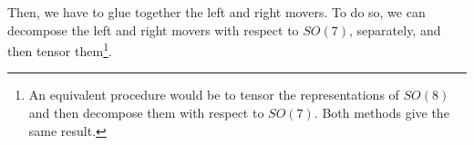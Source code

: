 Then, we have to glue together the left and right movers. To do so, we can decompose the left and right movers with respect to $SO(7)$, separately, and then tensor them\footnote{An equivalent procedure would be to tensor the representations of $SO(8)$ and then decompose them with respect to $SO(7)$. Both methods give the same result.}.
\begin{equation*}

\end{equation*}